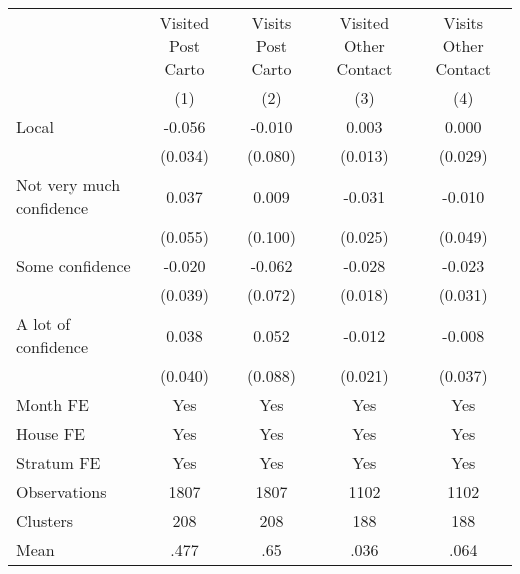 {
\def\sym#1{\ifmmode^{#1}\else\(^{#1}\)\fi}
\begin{tabular}{l*{4}{c}}
\toprule
                &\multicolumn{1}{c}{Visited Post Carto}&\multicolumn{1}{c}{Visits Post Carto}&\multicolumn{1}{c}{Visited Other Contact}&\multicolumn{1}{c}{Visits Other Contact}\\
                &\multicolumn{1}{c}{(1)}         &\multicolumn{1}{c}{(2)}         &\multicolumn{1}{c}{(3)}         &\multicolumn{1}{c}{(4)}         \\
\midrule
Local           &   -0.056         &   -0.010         &    0.003         &    0.000         \\
                &  (0.034)         &  (0.080)         &  (0.013)         &  (0.029)         \\
Not very much confidence&    0.037         &    0.009         &   -0.031         &   -0.010         \\
                &  (0.055)         &  (0.100)         &  (0.025)         &  (0.049)         \\
Some confidence &   -0.020         &   -0.062         &   -0.028         &   -0.023         \\
                &  (0.039)         &  (0.072)         &  (0.018)         &  (0.031)         \\
A lot of confidence&    0.038         &    0.052         &   -0.012         &   -0.008         \\
                &  (0.040)         &  (0.088)         &  (0.021)         &  (0.037)         \\
Month FE        &      Yes         &      Yes         &      Yes         &      Yes         \\
House FE        &      Yes         &      Yes         &      Yes         &      Yes         \\
Stratum FE      &      Yes         &      Yes         &      Yes         &      Yes         \\
\midrule
Observations    &     1807         &     1807         &     1102         &     1102         \\
Clusters        &      208         &      208         &      188         &      188         \\
Mean            &     .477         &      .65         &     .036         &     .064         \\
\bottomrule
\end{tabular}
}
